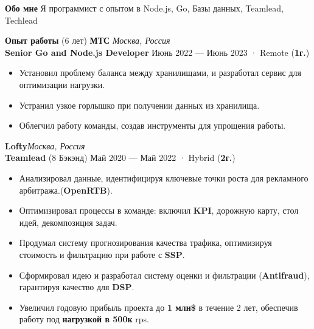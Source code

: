 \documentclass{resume}
\begin{document}
\begin{rSection}{\textbf{Обо мне}}
{
    Я программист с опытом в Node.js, Go, Базы данных, Teamlead, Techlead
}

\end{rSection}
\begin{rSection}{\textbf{Опыт работы} (6 лет) }
    \textbf{МТС} \hfill \textit{Москва, Россия} \\
    \textbf{Senior Go and Node.js Developer}  \hfill Июнь 2022 --- Июнь 2023 · Remote ({\textbf{1г.}})
    \begin{itemize}
        \item Установил проблему баланса между хранилищами, и разработал сервис для оптимизации  нагрузки.
        \item Устранил узкое горлышко при получении данных из хранилища.
        \item Облегчил работу команды, создав инструменты для упрощения работы.
    \end{itemize}

    \textbf{Lofty}\hfill \textit{Москва, Россия} \\
    \textbf{Teamlead} (8 Бэкэнд) \hfill Май 2020 --- Май 2022 · Hybrid ({\textbf{2г.}})
    \begin{itemize}
        \item Анализировал данные, идентифицируя ключевые точки роста для рекламного арбитража.(\textbf{OpenRTB})\@.
        \item Оптимизировал процессы в команде: включил \textbf{KPI}, дорожную карту, стол идей, декомпозиция задач\@.
        \item Продумал систему прогнозирования качества трафика, оптимизируя стоимость и фильтрацию при работе с \textbf{SSP}\@.
        \item Сформировал идею и разработал систему оценки и фильтрации (\textbf{Antifraud}), гарантируя качество для \textbf{DSP}\@.
        \item Увеличил годовую прибыль проекта до \textbf{1 млн\$} в течение 2 лет, обеспечив работу под \textbf{нагрузкой в 500к} rps\@.
    \end{itemize}


\end{rSection}
\end{document}
